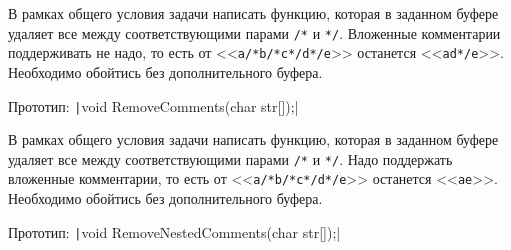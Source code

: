 
\begin{zztask}
В рамках общего условия задачи написать функцию, которая в заданном буфере
удаляет все между соответствующими парами \texttt{/*} и \texttt{*/}.
Вложенные комментарии поддерживать не надо, то есть от 
<<\texttt{a/*b/*c*/d*/e}>> останется <<\texttt{ad*/e}>>. 
Необходимо обойтись без дополнительного буфера.

Прототип: \texttt|void RemoveComments(char str[]);|
\end{zztask}


\begin{zztask}
В рамках общего условия задачи написать функцию, которая в заданном буфере
удаляет все между соответствующими парами \texttt{/*} и \texttt{*/}.
Надо поддержать вложенные комментарии, то есть от 
<<\texttt{a/*b/*c*/d*/e}>> останется <<\texttt{ae}>>. 
Необходимо обойтись без дополнительного буфера.

Прототип: \texttt|void RemoveNestedComments(char str[]);|
\end{zztask}

